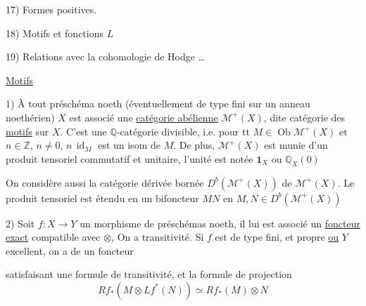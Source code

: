 17) Formes positives.

18) Motifs et fonctions $L$

19) Relations avec la cohomologie de Hodge \dots

\uline{Motifs}

1) À tout préschéma noeth (éventuellement de type fini sur un anneau
noethérien) $X$ est associé une \uline{catégorie abélienne}
$\mathcal{M}^+(X)$, dite catégorie des \uline{motifs}  sur $X$.
C'est une
$\mathbb{Q}$-catégorie  divisible, i.e. pour tt
$M\in\operatorname{Ob}\mathcal{M}^+(X)$ et $n\in\mathbb{Z}$, $n\ne0$,
$n\,\operatorname{id}_M$ est un isom
de $M$. De plus, $\mathcal{M}^+(X)$ est munie d'un
produit tensoriel commutatif et unitaire,
l'unité est notée $\mathbf1_X$ ou $\mathbb{Q}_X(0)$


On considère aussi la catégorie dérivée bornée
$D^b(\mathcal{M}^+(X))$ de $\mathcal{M}^+(X)$. Le produit tensoriel est
étendu en un bifoncteur $M$\uuline{$\otimes$}$N$ en $M,N\in D^b(\mathcal{M}^+(X))$

2) Soit $f:X\longrightarrow Y$ un morphisme de préschémas
 noeth, il lui est associé un \uline{foncteur}
\uline{exact}
compatible avec $\otimes$,
On a transitivité.
Si $f$ est de type fini, et propre \uline{ou} $Y$ excellent,
on  a de  un foncteur

satisfaisant une formule de transitivité,
et la formule de projection
\[
 Rf_*(M\otimes Lf^*(N))\simeq Rf_*(M)\otimes N
\]

